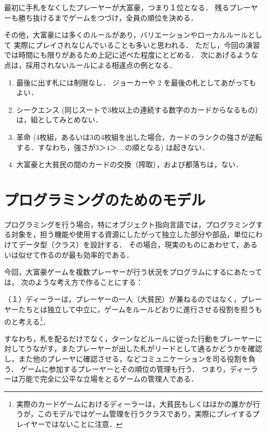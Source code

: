 最初に手札をなくしたプレーヤーが大富豪，つまり１位となる．
残るプレーヤーも勝ち抜けるまでゲームをつづけ，全員の順位を決める．

その他，大富豪には多くのルールがあり，バリエーションやローカルルールとして
実際にプレイされなじんでいることも多いと思われる．
ただし，今回の演習では時間にも限りがあるため上記に述べた程度にとどめる．
次にあげるような点は，採用されないルールによる相違点の例となる．
\begin{enumerate}
\item[(1)] 最後に出す札には制限なし．
ジョーカーや 2 を最後の札としてあがってもよい．
\item[(2)] シークエンス (同じスートで3枚以上の連続する数字のカードからなるもの）は，組としてみとめない．
\item[(3)] 革命 (4枚組，あるいは3の4枚組を出した場合，カードのランクの強さが逆転する．すなわち，強さが3＞4＞....の順となる) は起きない．
\item[(４)] 大富豪と大貧民の間のカードの交換（搾取），および都落ちは，ない．
\end{enumerate}

\section{プログラミングのためのモデル}
プログラミングを行う場合，特にオブジェクト指向言語では，プログラミングする対象を，担う機能や使用する資源にしたがって独立した部分や部品，単位にわけてデータ型（クラス）を設計する．
その場合，現実のものにあわせて，あるいは似せて作るのが最も効率的である．

今回，大富豪ゲームを複数プレーヤーが行う状況をプログラムにするにあたっては，
次のような考え方で作ることにする：

（１）ディーラーは，プレーヤーの一人（大貧民）が兼ねるのではなく，プレーヤーたちとは独立して中立に，ゲームをルールどおりに進行させる役割を担うものと考える\footnote{実際のカードゲームにおけるディーラーは，大貧民もしくはほかの誰かが行うが，このモデルではゲーム管理を行うクラスであり，実際にプレイするプレイヤーではないことに注意．}．

すなわち，札を配るだけでなく，ターンなどルールに従った行動をプレーヤーに対してうながす，またプレーヤーが出した札がリードとして通るかどうかを確認し，また他のプレーヤに確認させる，などコミュニケーションを司る役割を負う．
ゲームに参加するプレーヤーとその順位の管理も行う．
つまり，ディーラーは万能で完全に公平な立場をとるゲームの管理人である．

